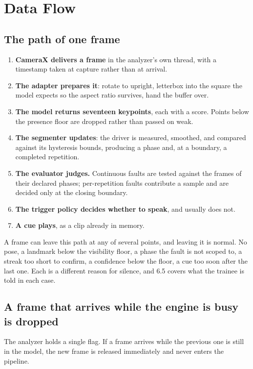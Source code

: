 \section{Data Flow}
\label{sec:5.5}

\subsection{The path of one frame}
\label{sec:5.5.1}

\begin{enumerate}
\item \textbf{CameraX delivers a frame} in the analyzer's own thread, with a timestamp taken at capture rather than at arrival.
\item \textbf{The adapter prepares it}: rotate to upright, letterbox into the square the model expects so the aspect ratio survives, hand the buffer over.
\item \textbf{The model returns seventeen keypoints}, each with a score. Points below the presence floor are dropped rather than passed on weak.
\item \textbf{The segmenter updates}: the driver is measured, smoothed, and compared against its hysteresis bounds, producing a phase and, at a boundary, a completed repetition.
\item \textbf{The evaluator judges.} Continuous faults are tested against the frames of their declared phases; per-repetition faults contribute a sample and are decided only at the closing boundary.
\item \textbf{The trigger policy decides whether to speak}, and usually does not.
\item \textbf{A cue plays}, as a clip already in memory.
\end{enumerate}

A frame can leave this path at any of several points, and leaving it is normal. No pose, a landmark below the visibility floor, a phase the fault is not scoped to, a streak too short to confirm, a confidence below the floor, a cue too soon after the last one. Each is a different reason for silence, and 6.5 covers what the trainee is told in each case.

\subsection{A frame that arrives while the engine is busy is dropped}
\label{sec:5.5.2}

The analyzer holds a single flag. If a frame arrives while the previous one is still in the model, the new frame is released immediately and never enters the pipeline.

